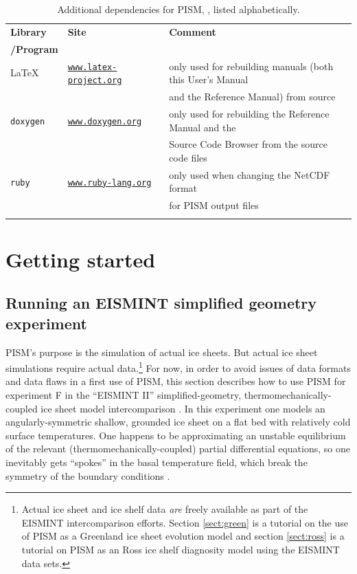 \documentclass[11pt,final]{amsart}
\renewcommand{\t}[1]{\texttt{#1}}
\begin{document}
\begin{table}[ht]
\caption{Additional dependencies for PISM, , listed alphabetically.  }\label{tab:PISMdepends_superdev}
\small
\begin{tabular}{@{}llll}\hline
\textbf{Library} & \textbf{Site} & \textbf{Comment} \\
\textbf{/Program} &  &  &  \\ \hline
\LaTeX & \href{http://www.latex-project.org/}{\t{www.latex-project.org}} & only used for rebuilding manuals (both this User's Manual  \\
 &  & and the Reference Manual) from source \\
\texttt{doxygen} & \href{http://www.stack.nl/~dimitri/doxygen/}{\t{www.doxygen.org}} & only used for rebuilding the Reference Manual and the \\
 & & Source Code Browser from the source code files \\
\texttt{ruby} & \href{http://www.ruby-lang.org/en/}{\texttt{www.ruby-lang.org}} & only used when changing the NetCDF format \\
 &  & for PISM output files \\
\hline
\normalsize
\end{tabular}
\end{table}


\clearpage\newpage
\section{Getting started}\label{sect:start}

\subsection{Running an EISMINT simplified geometry experiment}  PISM's purpose is the simulation of actual ice sheets.  But actual ice sheet simulations require actual data.\footnote{Actual ice sheet and ice shelf data \emph{are} freely available as part of the EISMINT intercomparison efforts.  Section \ref{sect:green} is a tutorial on the use of PISM as a Greenland ice sheet evolution model and section \ref{sect:ross} is a tutorial on PISM as an Ross ice shelf diagnosity model using the EISMINT data sets.}  For now, in order to avoid issues of data formats and data flaws in a first use of PISM, this section describes how to use PISM for experiment F in the ``EISMINT II'' simplified-geometry, thermomechanically-coupled ice sheet model intercomparison \cite{EISMINT00}.  In this experiment one models an angularly-symmetric shallow, grounded ice sheet on a flat bed with relatively cold surface temperatures.   One happens to be approximating an unstable equilibrium of the relevant (thermomechanically-coupled) partial differential equations, so one inevitably gets ``spokes'' in the basal temperature field, which break the symmetry of the boundary conditions \cite{BBL,PayneBaldwin,SaitoEISMINT}.
\end{document}
